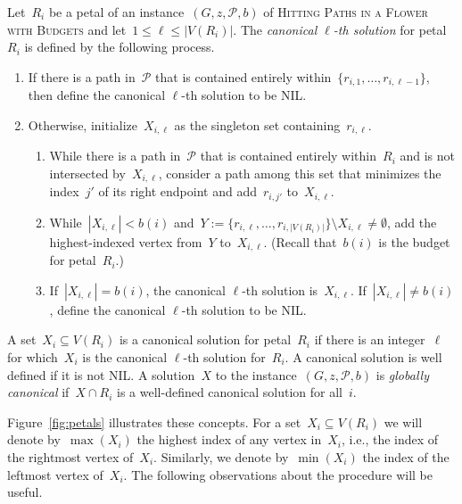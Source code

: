 \let\accentvec\vec  \documentclass{llncs}
\renewcommand{\P}{\ensuremath{\mathcal{P}}\xspace}
\newcommand{\HitPathsInFlower}{\textsc{Hitting Paths in a Flower with Budgets}\xspace}
\begin{document}
\begin{definition} \label{definition:canonical}
Let~$R_i$ be a petal of an instance~$(G,z,\P,b)$ of \HitPathsInFlower and let~$1 \leq \ell \leq |V(R_i)|$. The \emph{canonical $\ell$-th solution} for petal~$R_i$ is defined by the following process.
\begin{enumerate}
	\item If there is a path in~$\P$ that is contained entirely within~$\{r_{i,1}, \ldots, r_{i,\ell-1}\}$, then define the canonical $\ell$-th solution to be NIL.\label{step:earlyout}
	\item Otherwise, initialize~$X_{i,\ell}$ as the singleton set containing~$r_{i,\ell}$.
	\begin{enumerate}
		\item While there is a path in~$\P$ that is contained entirely within~$R_i$ and is not intersected by~$X_{i,\ell}$, consider a path among this set that minimizes the index~$j'$ of its right endpoint and add~$r_{i,j'}$ to~$X_{i,\ell}$.\label{step:hitpath}
		\item While~$|X_{i,\ell}| < b(i)$ and~$Y := \{r_{i,\ell}, \ldots, r_{i,|V(R_i)|}\} \setminus X_{i,\ell} \neq \emptyset$, add the highest-indexed vertex from~$Y$ to~$X_{i,\ell}$. (Recall that~$b(i)$ is the budget for petal~$R_i$.)\label{step:fillsize}
		\item If~$|X_{i,\ell}| = b(i)$, the canonical $\ell$-th solution is~$X_{i,\ell}$. If~$|X_{i,\ell}| \neq b(i)$, define the canonical $\ell$-th solution to be NIL.\label{step:toolarge}
		\end{enumerate}
\end{enumerate}
A set~$X_i \subseteq V(R_i)$ is a canonical solution for petal~$R_i$ if there is an integer~$\ell$ for which~$X_i$ is the canonical $\ell$-th solution for~$R_i$. A canonical solution is well defined if it is not NIL. A solution~$X$ to the instance~$(G,z,\P,b)$ is \emph{globally canonical} if~$X \cap R_i$ is a well-defined canonical solution for all~$i$.
\end{definition}

Figure~\ref{fig:petals} illustrates these concepts. For a set~$X_i \subseteq V(R_i)$ we will denote by~$\max(X_i)$ the highest index of any vertex in~$X_i$, i.e., the index of the rightmost vertex of~$X_i$. Similarly, we denote by~$\min(X_i)$ the index of the leftmost vertex of~$X_i$. The following observations about the procedure will be useful.
\end{document}
